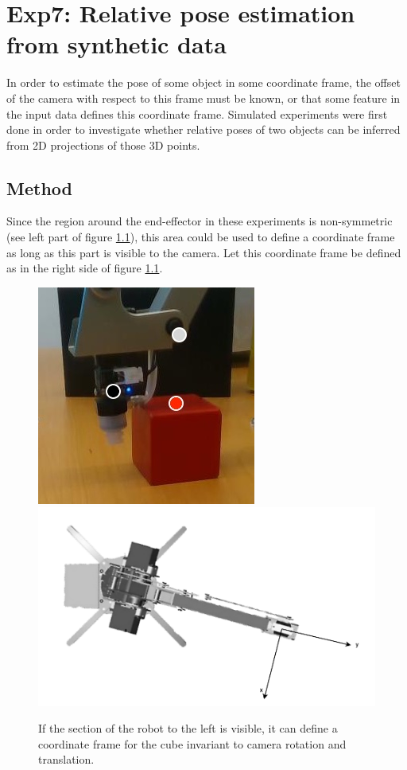 \chapter{Exp7: Relative pose estimation from synthetic data}

In order to estimate the pose of some object in some coordinate frame, the
offset of the camera with respect to this frame must be known, or that some
feature in the input data defines this coordinate frame. Simulated experiments
were first done in order to investigate whether relative poses of two objects
can be inferred from 2D projections of those 3D points.

\section{Method}
\label{subsec:sim_moving}

Since the region around the end-effector in these experiments is non-symmetric
(see left part of figure \ref{fig:end-effector-frame}), this area could be used
to define a coordinate frame as long as this part is visible to the camera. Let
this coordinate frame be defined as in the right side of figure
\ref{fig:end-effector-frame}.

\begin{figure}[h!]
    \centering
    \includegraphics[width=0.32 \textwidth]{res/pose-feature-points.jpg}
    \includegraphics[width=0.5 \textwidth]{res/end-effector-frame.pdf}

    \caption{If the section of the robot to the left is visible, it can define
    a coordinate frame for the cube invariant to camera rotation and
    translation.}

    \label{fig:end-effector-frame}
    
\end{figure}

